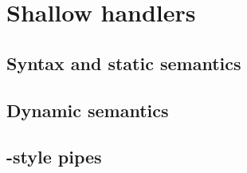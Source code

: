 \documentclass[12pt,phd,lfcs,twoside,openright,logo,leftchapter,normalheadings]{infthesis}
\theoremstyle{plain}
\theoremstyle{definition}
\newtheorem{example}{Example}[chapter]
\begin{document}





\section{Shallow handlers}
\label{sec:unary-shallow-handlers}

\subsection{Syntax and static semantics}
\subsection{Dynamic semantics}

\subsection{\UNIX{}-style pipes}
\label{sec:pipes}
\end{document}
